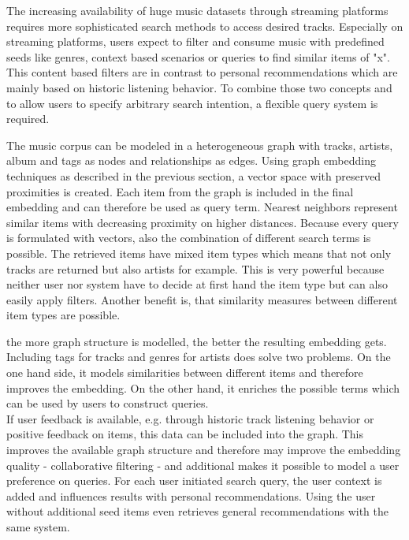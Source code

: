 \documentclass[sigconf]{acmart}
\begin{document}
\iffalse
	The increasing availability of huge music datasets through streaming platforms requires more sophisticated search methods to access desired tracks. Especially on streaming platforms, users expect to filter and consume music with predefined seeds like genres, context based scenarios or queries to find similar items of "x". This content based filters are in contrast to personal recommendations which are mainly based on historic listening behavior. To combine those two concepts and to allow users to specify arbitrary search intention, a flexible query system is required.
	
	The music corpus can be modeled in a heterogeneous graph with tracks, artists, album and tags as nodes and relationships as edges. Using graph embedding techniques as described in the previous section, a vector space with preserved proximities is created. Each item from the graph is included in the final embedding and can therefore be used as query term. Nearest neighbors represent similar items with decreasing proximity on higher distances. Because every query is formulated with vectors, also the combination of different search terms is possible. The retrieved items have mixed item types which means that not only tracks are returned but also artists for example. This is very powerful because neither user nor system have to decide at first hand the item type but can also easily apply filters. Another benefit is, that similarity measures between different item types are possible.
	
	the more graph structure is modelled, the better the resulting embedding gets. Including tags for tracks and genres for artists does solve two problems. On the one hand side, it models similarities between different items and therefore improves the embedding. On the other hand, it enriches the possible terms which can be used by users to construct queries. \\
	
	If user feedback is available, e.g. through historic track listening behavior or positive feedback on items, this data can be included into the graph. This improves the available graph structure and therefore may improve the embedding quality - collaborative filtering - and additional makes it possible to model a user preference on queries. For each user initiated search query, the user context is added and influences results with personal recommendations. Using the user without additional seed items even retrieves general recommendations with the same system.
\end{document}
